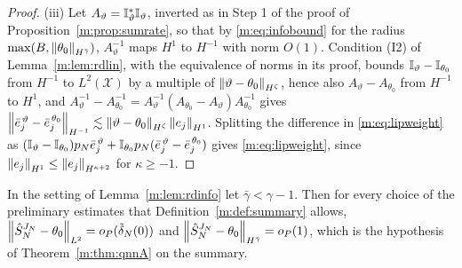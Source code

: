 \begin{proof}
(iii) Let $A_\vartheta=\mathbb{I}^*_\vartheta\mathbb{I}_\vartheta$, inverted as in Step 1 of the proof of Proposition~\ref{m:prop:sumrate}, so that by \eqref{m:eq:infobound} for the radius $\max(B,\left\|\theta_0\right\|_{H^{\bar\gamma}})$, $A_\vartheta^{-1}$ maps $H^1$ to $H^{-1}$ with norm $O(1)$. Condition (I2) of Lemma~\ref{m:lem:rdlin}, with the equivalence of norms in its proof, bounds $\mathbb{I}_\vartheta-\mathbb{I}_{\theta_0}$ from $H^{-1}$ to $L^2(\mathcal X)$ by a multiple of $\left\|\vartheta-\theta_0\right\|_{H^\zeta}$, hence also $A_\vartheta-A_{\theta_0}$ from $H^{-1}$ to $H^1$, and $A_\vartheta^{-1}-A_{\theta_0}^{-1}=A_\vartheta^{-1}(A_{\theta_0}-A_\vartheta)A_{\theta_0}^{-1}$ gives $\left\|\bar e_j^{\,\vartheta}-\bar e_j^{\,\theta_0}\right\|_{H^{-1}}\lesssim\left\|\vartheta-\theta_0\right\|_{H^\zeta}\left\|e_j\right\|_{H^1}$. Splitting the difference in \eqref{m:eq:lipweight} as $(\mathbb{I}_\vartheta-\mathbb{I}_{\theta_0})p_N\bar e^{\,\vartheta}_j+\mathbb{I}_{\theta_0}p_N(\bar e^{\,\vartheta}_j-\bar e^{\,\theta_0}_j)$ gives \eqref{m:eq:lipweight}, since $\left\|e_j\right\|_{H^1}\le\left\|e_j\right\|_{H^{\kappa+2}}$ for $\kappa\ge-1$.
\end{proof}

\begin{proposition}\label{m:prop:sumrd}
In the setting of Lemma~\ref{m:lem:rdinfo} let $\bar\gamma<\gamma-1$. Then for every choice of the preliminary estimates that Definition~\ref{m:def:summary} allows, $\left\|\hat S^{J_N}_N-\theta_0\right\|_{L^2}=o_P(\tilde\delta_N(0))$ and $\left\|\hat S^{J_N}_N-\theta_0\right\|_{H^{\bar\gamma}}=o_P(1)$, which is the hypothesis of Theorem~\ref{m:thm:qnnA} on the summary.
\end{proposition}

